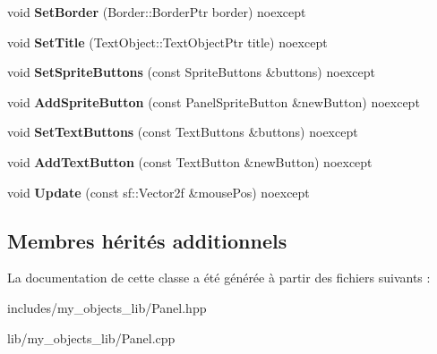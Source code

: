 \begin{DoxyCompactItemize}
\mbox{\label{classmy_1_1Panel_a040474d4d94619dc3f38be0210704fe5}} 
void {\bfseries Set\+Border} (Border\+::\+Border\+Ptr border) noexcept
\item 
\mbox{\label{classmy_1_1Panel_a04b1f6f32550c35620140526c2242da4}} 
void {\bfseries Set\+Title} (Text\+Object\+::\+Text\+Object\+Ptr title) noexcept
\item 
\mbox{\label{classmy_1_1Panel_a1631e0c015ceca7bd69550fed6aa436b}} 
void {\bfseries Set\+Sprite\+Buttons} (const Sprite\+Buttons \&buttons) noexcept
\item 
\mbox{\label{classmy_1_1Panel_aa8ae6f08a24293d0251c5a787f66cf04}} 
void {\bfseries Add\+Sprite\+Button} (const Panel\+Sprite\+Button \&new\+Button) noexcept
\item 
\mbox{\label{classmy_1_1Panel_a5cf0eb71b153928290fa38883bf2212d}} 
void {\bfseries Set\+Text\+Buttons} (const Text\+Buttons \&buttons) noexcept
\item 
\mbox{\label{classmy_1_1Panel_aae60e439501dabbea7e4737518172411}} 
void {\bfseries Add\+Text\+Button} (const Text\+Button \&new\+Button) noexcept
\item 
\mbox{\label{classmy_1_1Panel_aaeb58913cdea3605880819f9afe4565a}} 
void {\bfseries Update} (const sf\+::\+Vector2f \&mouse\+Pos) noexcept
\end{DoxyCompactItemize}
\subsection*{Membres hérités additionnels}


La documentation de cette classe a été générée à partir des fichiers suivants \+:\begin{DoxyCompactItemize}
\item 
includes/my\+\_\+objects\+\_\+lib/Panel.\+hpp\item 
lib/my\+\_\+objects\+\_\+lib/Panel.\+cpp\end{DoxyCompactItemize}
